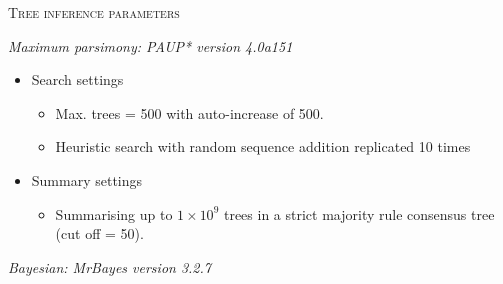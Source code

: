 \documentclass[12pt,letterpaper]{article}
\renewcommand{\section}[1]{%
\bigskip
\begin{center}
\begin{Large}
\normalfont\scshape #1
\medskip
\end{Large}
\end{center}}
\renewcommand{\subsection}[1]{%
\bigskip
\begin{center}
\begin{large}
\normalfont\itshape #1
\end{large}
\end{center}}
\begin{document}
\section{Tree inference parameters}

\subsection{Maximum parsimony: PAUP* version 4.0a151 \cite{swofford2001paup}}

\begin{itemize}
  \item Search settings
  \begin{itemize}
    \item Max. trees = 500 with auto-increase of 500.
    \item Heuristic search with random sequence addition replicated 10 times
  \end{itemize}
  \item Summary settings
  \begin{itemize}
    \item Summarising up to $1\times10^9$ trees in a strict majority rule consensus tree (cut off = 50).
  \end{itemize}
\end{itemize}

\subsection{Bayesian: MrBayes version 3.2.7 \cite{Ronquist2012mrbayes}}
\end{document}
